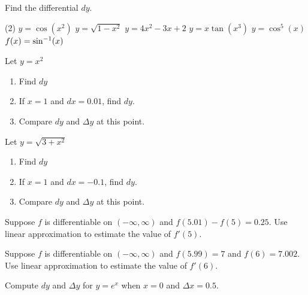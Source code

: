 \documentclass[answers]{exam}
\begin{document}
\begin{ex*}
  Find the differential $dy$.
\end{ex*}
\begin{tasks}[after-item-skip=\stretch{1}, label=~](2)
  \task $y=\cos(x^2)$
  \task $y=\sqrt{1-x^2}$
  \task $y=4x^2-3x+2$
  \task $y=x\tan(x^3)$
  \task $y=\cos^5(x)$
  \task $f(x)=\sin^{-1}(x)$
\end{tasks}
\pagebreak
\begin{ex*}
  Let $y=x^2$
\end{ex*}
\begin{enumerate}[label=\alph*), itemsep=\stretch{1}]
  \item Find $dy$
  \item If $x=1$ and $dx=0.01$, find $dy$.
  \item Compare $dy$ and $\Delta y$ at this point.
\end{enumerate}

\begin{ex*}
  Let $y=\sqrt{3+x^2}$
\end{ex*}
\begin{enumerate}[label=\alph*), itemsep=\stretch{1}]
  \item Find $dy$
  \item If $x=1$ and $dx=-0.1$, find $dy$.
  \item Compare $dy$ and $\Delta y$ at this point.
\end{enumerate}

\pagebreak
\begin{ex*}
  Suppose $f$ is differentiable on $(-\infty,\infty)$ and $f(5.01)-f(5)=0.25$. Use linear approximation to estimate the value of $f'(5)$.
\end{ex*}

\begin{ex*}
  Suppose $f$ is differentiable on $(-\infty,\infty)$ and $f(5.99)=7$ and $f(6)=7.002$. Use linear approximation to estimate the value of $f'(6)$.
\end{ex*}
\pagebreak

\begin{ex*}
  Compute $dy$ and $\Delta y$ for $y=e^x$ when $x=0$ and $\Delta x=0.5$.
\end{ex*}
\end{document}
